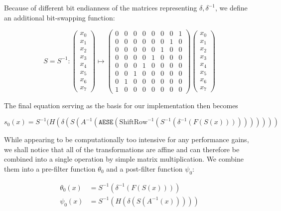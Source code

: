 Because of different bit endianness of the matrices representing
$\delta,\delta^{-1}$, we define an additional bit-swapping function:

\[
    S=S^{-1}:\begin{pmatrix}x_0\\x_1\\x_2\\x_3\\x_4\\x_5\\x_6\\x_7\end{pmatrix}\mapsto
    \begin{pmatrix}
        0 & 0 & 0 & 0 & 0 & 0 & 0 & 1 \\
        0 & 0 & 0 & 0 & 0 & 0 & 1 & 0 \\
        0 & 0 & 0 & 0 & 0 & 1 & 0 & 0 \\
        0 & 0 & 0 & 0 & 1 & 0 & 0 & 0 \\
        0 & 0 & 0 & 1 & 0 & 0 & 0 & 0 \\
        0 & 0 & 1 & 0 & 0 & 0 & 0 & 0 \\
        0 & 1 & 0 & 0 & 0 & 0 & 0 & 0 \\
        1 & 0 & 0 & 0 & 0 & 0 & 0 & 0
    \end{pmatrix}
    \begin{pmatrix}x_0\\x_1\\x_2\\x_3\\x_4\\x_5\\x_6\\x_7\end{pmatrix}
\]

The final equation serving as the basis for our implementation then becomes

\[
    s_0(x)=S^{-1}(H(\delta(S(A^{-1}(\texttt{AESE}(\text{ShiftRow}^{-1}(S^{-1}(\delta^{-1}(F(S(x))))))))))
\]

While appearing to be computationally too intensive for any performance gains,
we shall notice that all of the transformations are affine and can therefore be
combined into a single operation by simple matrix multiplication. We combine
them into a pre-filter function $\theta_0$ and a post-filter function $\psi_0$:

\begin{align*}
    \theta_0(x)&=S^{-1}(\delta^{-1}(F(S(x)))) \\
    \psi_0(x)&=S^{-1}(H(\delta(S(A^{-1}(x)))))
\end{align*}

